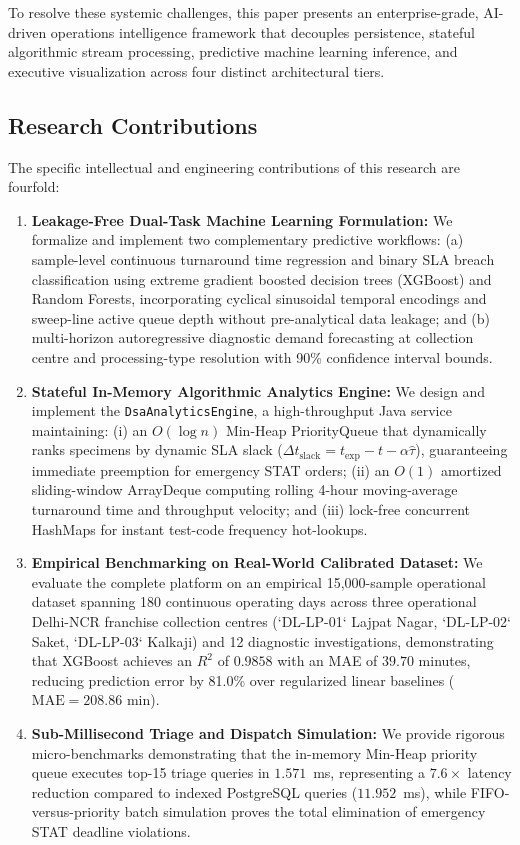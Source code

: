 \documentclass[conference]{IEEEtran}
\begin{document}
To resolve these systemic challenges, this paper presents an enterprise-grade, AI-driven operations intelligence framework that decouples persistence, stateful algorithmic stream processing, predictive machine learning inference, and executive visualization across four distinct architectural tiers.

\subsection{Research Contributions}
The specific intellectual and engineering contributions of this research are fourfold:
\begin{enumerate}
    \item \textbf{Leakage-Free Dual-Task Machine Learning Formulation:} We formalize and implement two complementary predictive workflows: (a) sample-level continuous turnaround time regression and binary SLA breach classification using extreme gradient boosted decision trees (XGBoost) and Random Forests, incorporating cyclical sinusoidal temporal encodings and sweep-line active queue depth without pre-analytical data leakage; and (b) multi-horizon autoregressive diagnostic demand forecasting at collection centre and processing-type resolution with 90\% confidence interval bounds.
    \item \textbf{Stateful In-Memory Algorithmic Analytics Engine:} We design and implement the \texttt{DsaAnalyticsEngine}, a high-throughput Java service maintaining: (i) an $O(\log n)$ Min-Heap PriorityQueue that dynamically ranks specimens by dynamic SLA slack ($\Delta t_{\text{slack}} = t_{\text{exp}} - t - \alpha \hat{\tau}$), guaranteeing immediate preemption for emergency STAT orders; (ii) an $O(1)$ amortized sliding-window ArrayDeque computing rolling 4-hour moving-average turnaround time and throughput velocity; and (iii) lock-free concurrent HashMaps for instant test-code frequency hot-lookups.
    \item \textbf{Empirical Benchmarking on Real-World Calibrated Dataset:} We evaluate the complete platform on an empirical 15,000-sample operational dataset spanning 180 continuous operating days across three operational Delhi-NCR franchise collection centres (`DL-LP-01` Lajpat Nagar, `DL-LP-02` Saket, `DL-LP-03` Kalkaji) and 12 diagnostic investigations, demonstrating that XGBoost achieves an $R^2$ of $0.9858$ with an MAE of $39.70$ minutes, reducing prediction error by 81.0\% over regularized linear baselines ($\text{MAE} = 208.86$ min).
    \item \textbf{Sub-Millisecond Triage and Dispatch Simulation:} We provide rigorous micro-benchmarks demonstrating that the in-memory Min-Heap priority queue executes top-15 triage queries in $1.571$~ms, representing a $7.6\times$ latency reduction compared to indexed PostgreSQL queries ($11.952$~ms), while FIFO-versus-priority batch simulation proves the total elimination of emergency STAT deadline violations.
\end{enumerate}
\end{document}
